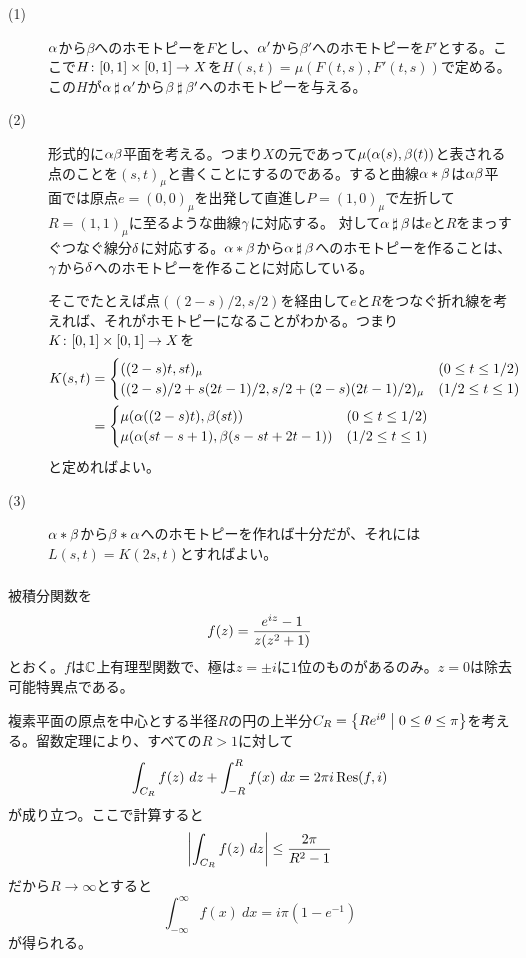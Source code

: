 \begin{sol} ${}$
  \begin{description}
    \item[(1)] ${\alpha}$から$\beta$へのホモトピーを$F$とし、${\alpha}'$から$\beta'$へのホモトピーを$F'$とする。ここで$H \colon [0,1] \times [0,1] \to X$を$H(s,t) = \mu( F(t,s), F'(t,s) )$で定める。この$H$が${\alpha} \mathbin{\sharp} {\alpha}'$から$\beta \mathbin{\sharp} \beta'$へのホモトピーを与える。
    \item[(2)] 形式的に${\alpha} \beta$平面を考える。つまり$X$の元であって$\mu({\alpha}(s), \beta(t))$と表される点のことを$(s,t)_{\mu}$と書くことにするのである。すると曲線${\alpha} * \beta$は${\alpha} \beta$平面では原点$e = (0,0)_{\mu}$を出発して直進し$P =(1,0)_{\mu}$で左折して$R=(1,1)_{\mu}$に至るような曲線${\gamma}$に対応する。
    対して${\alpha} \mathbin{\sharp} \beta$は$e$と$R$をまっすぐつなぐ線分${\delta}$に対応する。${\alpha} * \beta$から${\alpha} \mathbin{\sharp} \beta$へのホモトピーを作ることは、${\gamma}$から${\delta}$へのホモトピーを作ることに対応している。

    そこでたとえば点$( (2-s)/2, s/2 )$を経由して$e$と$R$をつなぐ折れ線を考えれば、それがホモトピーになることがわかる。つまり$K \colon [0,1] \times [0,1] \to X$を
    \begin{align*}
      K(s,t) &= \begin{cases}
      ( (2-s)t, st )_{\mu} &(0 \leq t \leq 1/2) \\
      (  (2-s)/2 + s(2t-1)/2, s/2 + (2-s)(2t-1)/2  )_{\mu} &(1/2 \leq t \leq 1)
    \end{cases} \\
    &= \begin{cases}
    \mu( {\alpha}((2-s)t), \beta(st) ) &(0 \leq t \leq 1/2) \\
    \mu(  {\alpha}( st - s + 1 ),\beta(s-st + 2t -1 ) ) &(1/2 \leq t \leq 1)
  \end{cases}
    \end{align*}
    と定めればよい。
    \item[(3)] ${\alpha} * \beta$から$\beta * {\alpha}$へのホモトピーを作れば十分だが、それには$L(s,t) = K(2s,t)$とすればよい。
  \end{description}
\end{sol}

\newpage


\subsubsection{}%
\begin{sol}
  被積分関数を
  \[
  f(z) = \frac{ e^{iz} - 1 }{z(z^2 +1)}
  \]
  とおく。$f$は${\mathbb C}$上有理型関数で、極は$z = \pm i$に$1$位のものがあるのみ。$z = 0$は除去可能特異点である。

  複素平面の原点を中心とする半径$R$の円の上半分$C_R = \left\{  Re^{i {\theta}}  \mathrel{} \middle| \mathrel{}  0 \leq {\theta} \leq \pi  \right\}$を考える。留数定理により、すべての$R > 1$に対して
  \[
  \int_{C_R} f(z) \ dz + \int_{-R}^R f(x) \ dx = 2 \pi i \Res(f,i)
  \]
  が成り立つ。ここで計算すると
  \[
  \left \lvert \int_{C_R} f(z) \ dz   \right \rvert \leq \frac{ 2\pi }{ R^2 - 1 }
  \]
  だから$R \to \infty$とすると
  \[
  \int_{- \infty}^{\infty} f(x) \ dx = i \pi (  1 - e^{-1})
  \]
  が得られる。
\end{sol}
